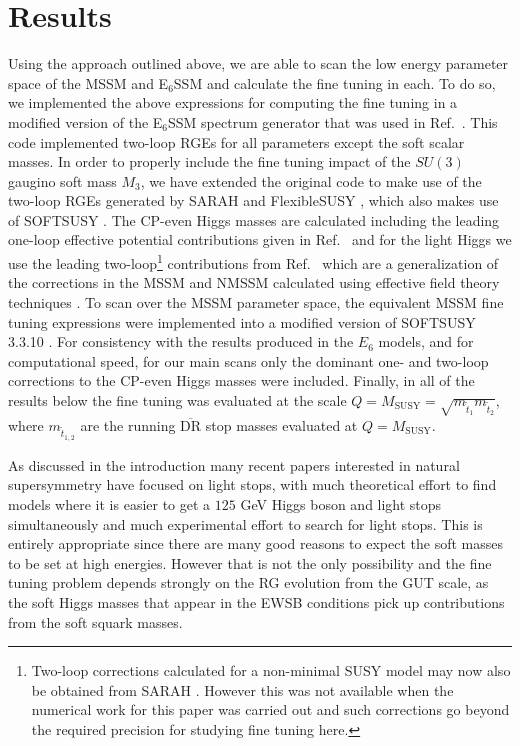 \documentclass[preprint,amsmath,amssymb,aps,superscriptaddress,prd,
showpacs,floatfix,nofootinbib]{revtex4-1}
\begin{document}
\section{\label{sec:results}Results}

Using the approach outlined above, we are able to scan the low energy
parameter space of the MSSM and E$_6$SSM and calculate the fine tuning
in each.  To do so, we implemented the above expressions for computing
the fine tuning in a modified version of the E$_6$SSM spectrum
generator that was used in Ref.~\cite{Athron:2013ipa}.  This code
implemented two-loop RGEs for all parameters except the soft scalar
masses.  In order to properly include the fine tuning impact of the
$SU(3)$ gaugino soft mass $M_3$, we have extended the original code to
make use of the two-loop RGEs generated by SARAH \cite{Staub:2009bi,
  Staub:2010jh, Staub:2012pb, Staub:2013tta} and FlexibleSUSY
\cite{Athron:2014yba}, which also makes use of SOFTSUSY
\cite{Allanach:2001kg, Allanach:2013kza}.  The CP-even Higgs masses
are calculated including the leading one-loop effective potential
contributions given in Ref.~\cite{Athron:2009bs} and for the light Higgs we
use the leading two-loop\footnote{Two-loop corrections calculated for
  a non-minimal SUSY model may now also be obtained from SARAH
  \cite{Goodsell:2014pla,Goodsell:2015ira}.  However this was not
  available when the numerical work for this paper was carried out and
  such corrections go beyond the required precision for studying fine
  tuning here.} contributions from Ref.~\cite{King:2005jy} which are a
generalization of the corrections in the MSSM and NMSSM calculated
using effective field theory techniques \cite{Carena:1995wu,
  Ellwanger:1999ji}.  To scan over the MSSM parameter space, the
equivalent MSSM fine tuning expressions were implemented into a
modified version of SOFTSUSY 3.3.10 \cite{Allanach:2001kg}.  For
consistency with the results produced in the $E_6$ models, and for
computational speed, for our main scans only the dominant one- and
two-loop corrections to the CP-even Higgs masses were included.
Finally, in all of the results below the fine tuning was evaluated at
the scale $Q = M_{\textrm{SUSY}} =
\sqrt{m_{\tilde{t}_1}m_{\tilde{t}_2}}$, where $m_{\tilde{t}_{1,2}}$
are the running $\overline{\textrm{DR}}$ stop masses evaluated at $Q =
M_{\textrm{SUSY}}$.

As discussed in the introduction many recent papers interested in
natural supersymmetry have focused on light stops, with much
theoretical effort to find models where it is easier to get a $125$
GeV Higgs boson and light stops simultaneously and much experimental
effort to search for light stops.  This is entirely appropriate since
there are many good reasons to expect the soft masses to be set at
high energies.  However that is not the only possibility and the fine
tuning problem depends strongly on the RG evolution from the GUT
scale, as the soft Higgs masses that appear in the EWSB conditions
pick up contributions from the soft squark masses.
\end{document}
